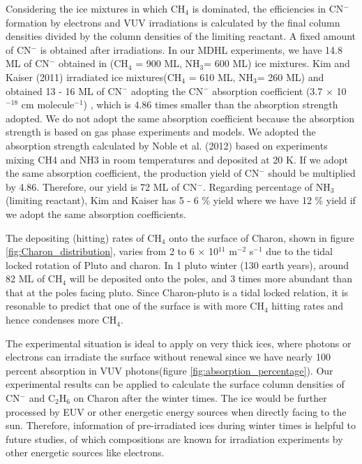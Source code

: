 Considering the ice mixtures in which CH$_4$ is dominated, the efficiencies in CN$^-$ formation by electrons and VUV irradiations is calculated by the final column densities divided by the column densities of the limiting reactant. A fixed amount of CN$^-$ is obtained after irradiations. In our MDHL experiments, we have 14.8 ML of CN$^-$ obtained in (CH$_4$ = 900 ML, NH$_3$= 600 ML) ice mixtures. Kim and Kaiser (2011) irradiated  ice mixtures(CH$_4$ = 610 ML, NH$_3$= 260 ML) and obtained 13 - 16 ML of CN$^-$ adopting the CN$^-$ absorption coefficient (3.7 $\times$ 10$^{-18}$ cm molecule$^{-1}$) \cite{georgieva2006computational}, which is 4.86 times smaller than the absorption strength adopted. We do not adopt the same absorption coefficient because the absorption strength is based on gas phase experiments and models. We adopted the absorption strength calculated by Noble et al. (2012) \cite{noble2012thermal} based on experiments mixing CH4 and NH3 in room temperatures and deposited at 20 K. If we adopt the same absorption coefficient, the production yield of CN$^-$ should be multiplied by 4.86. Therefore, our yield is 72 ML of CN$^-$. Regarding percentage of NH$_3$ (limiting reactant), Kim and Kaiser has 5 - 6 \% yield where we have 12 \% yield if we adopt the same absorption coefficients.

The depositing (hitting) rates of CH$_4$ onto the surface of Charon, shown in figure \ref{fig:Charon_distribution}, varies from 2 to 6 $\times$ 10$^{11}$ m$^{-2}$ s$^{-1}$ due to the tidal locked rotation of Pluto and charon. In 1 pluto winter (130 earth years), around 82 ML of CH$_4$ will be deposited onto the poles, and 3 times more abundant than that at the poles facing pluto. Since Charon-pluto is a tidal locked relation, it is resonable to predict that one of the surface is with more CH$_4$ hitting rates and hence condenses more CH$_4$.

The experimental situation is ideal to apply on very thick ices, where photons or electrons can irradiate the surface without renewal since we have nearly 100 percent absorption in VUV photons(figure \ref{fig:absorption_percentage}). Our experimental results can be applied to calculate the surface column densities of CN$^-$ and C$_2$H$_6$ on Charon after the winter times. The ice would be further processed by EUV or other energetic energy sources when directly facing to the sun. Therefore, information of pre-irradiated ices during winter times is helpful to future studies, of which compositions are known for irradiation experiments by other energetic sources like electrons.\\

